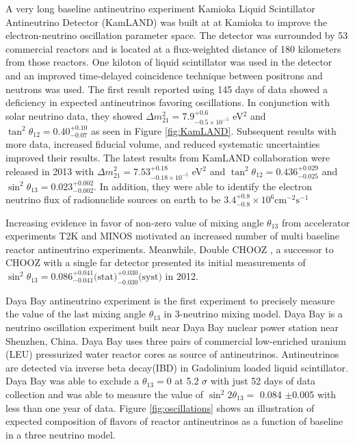 \documentclass[11pt]{article}
\numberwithin{equation}{section}
\begin{document}
A very long baseline antineutrino experiment Kamioka Liquid Scintillator Antineutrino Detector (KamLAND) was built at  at Kamioka \cite{araki2005measurement} to improve the electron-neutrino oscillation parameter space. The detector was surrounded by 53 commercial reactors and is located at a flux-weighted distance of 180 kilometers from those reactors. One kiloton of liquid scintillator was used in the detector and an improved time-delayed coincidence technique between positrons and neutrons was used. The first result reported using 145 days of data showed a deficiency in expected antineutrinos favoring oscillations. In conjunction with solar neutrino data, they showed $ \Delta m^{2}_{21} = 7.9^{+0.6} _{ - 0.5 \times 10^{-5}}$ eV$^2$ and $\tan^{2} \theta_{12} = 0.40 ^{+0.10}_{- 0.07} $ as seen in Figure \ref{fig:KamLAND}. Subsequent results with more data, increased fiducial volume, and reduced systematic uncertainties improved their results. The latest results from KamLAND collaboration were released in 2013 \cite{gando2013reactor} with $ \Delta m^{2}_{21} = 7.53^{+0.18} _{ - 0.18 \times 10^{-5}}$ eV$^2$ and $\tan^{2} \theta_{12} = 0.436 ^{+0.029}_{- 0.025} $ and $\sin ^{2} \theta _{13} = 0.023^{+ 0.002}_{-0.002}$. In addition, they were able to identify the electron neutrino flux of radionuclide sources on earth to be $3.4 ^{+0.8}_{-0.8} \times 10^{6} \text{cm}^{-2} \text{s}^{-1} $ 

Increasing evidence in favor of non-zero value of mixing angle $\theta_{13}$ from accelerator experiments T2K \cite{abe2011indication} and MINOS \cite{Minos} motivated an increased number of multi baseline reactor antineutrino experiments. Meanwhile, Double CHOOZ \cite{DoubleChooz}, a successor to CHOOZ with a single far detector presented its initial measurements of $\sin ^{2} \theta _{13} = 0.086 ^{+ 0.041} _{- 0.041}\text{(stat)} ^{+0.030} _{-0.030}\text{(syst)} $ in 2012.

Daya Bay antineutrino experiment is the first experiment to precisely measure the value of the last mixing angle $\theta_{13}$ in 3-neutrino mixing model. Daya Bay is a neutrino oscillation experiment built near Daya Bay nuclear power station near Shenzhen, China. Daya Bay uses three pairs of commercial low-enriched uranium (LEU) pressurized water reactor cores as source of antineutrinos. Antineutrinos are detected via inverse beta decay(IBD) in Gadolinium loaded liquid scintillator. Daya Bay was able to exclude a $\theta_{13}=$0 at 5.2 $\sigma$ \cite{DayabayZero} with just 52 days of data collection and was able to measure the value of $\sin ^{2}2 \theta_{13} =$ 0.084 $\pm$0.005 \cite{an2013improved} with less than one year of data. Figure \ref{fig:oscillations} shows an illustration of expected composition of flavors of reactor antineutrinos as a function of baseline in a three neutrino model. 
\end{document}

